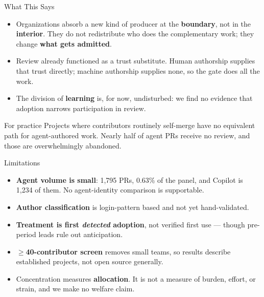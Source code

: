\begin{frame}{What This Says}
\begin{itemize}
  \item Organizations absorb a new kind of producer at the \textbf{boundary},
        not in the \textbf{interior}. They do not redistribute who does the
        complementary work; they change \textbf{what gets admitted}.
  \item Review already functioned as a trust substitute. Human authorship
        supplies that trust directly; machine authorship supplies none, so the
        gate does all the work.
  \item The division of \textbf{learning} is, for now, undisturbed: we find no
        evidence that adoption narrows participation in review.
\end{itemize}
\vfill
\begin{block}{For practice}
  Projects where contributors routinely self-merge have no equivalent path for
  agent-authored work. Nearly half of agent PRs receive no review, and those
  are overwhelmingly abandoned.
\end{block}
\end{frame}

\begin{frame}{Limitations}
\begin{itemize}
  \item \textbf{Agent volume is small}: 1,795 PRs, 0.63\% of the panel, and
        Copilot is 1,234 of them. No agent-identity comparison is supportable.
  \item \textbf{Author classification} is login-pattern based and not yet
        hand-validated.
  \item \textbf{Treatment is first \emph{detected} adoption}, not verified
        first use --- though pre-period leads rule out anticipation.
  \item \textbf{$\geq$40-contributor screen} removes small teams, so results
        describe established projects, not open source generally.
  \item Concentration measures \textbf{allocation}. It is not a measure of
        burden, effort, or strain, and we make no welfare claim.
\end{itemize}
\end{frame}

